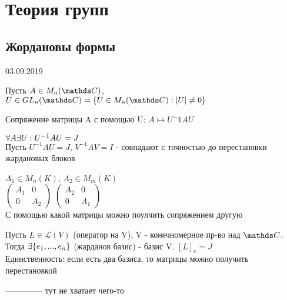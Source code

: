 \documentclass[12pt, fleqn]{article}
\begin{document}
  
    \section{Теория групп}
    \subsection{Жордановы формы}
    \begin{lect}{03.09.2019}
        \begin{utv}
            Пусть $A \in M_n(\CC)$, $U \in GL_n(\CC)=\{U \in M_n(\CC): |U| \neq 0\}$

            Сопряжение матрицы A с помощью U: $A \longmapsto U^-1 A U$
        \end{utv}

        \begin{theorem}
            $\forall A \exists U: U^{-1} A U = J$\\
            Пусть $U^{-1} A U = J$, $V^{-1} A V = I$ - совпадают с точностью до перестановки жардановых блоков
        \end{theorem}

        \begin{example}
            $A_1 \in M_n(K)$, $A_2 \in M_m(K)$\\
            $\begin{pmatrix}
              A_1 & 0\\
              0 & A_2
            \end{pmatrix}$
            $\begin{pmatrix}
              A_2 & 0\\
              0 & A_1
            \end{pmatrix}$\\
            С помощью какой матрицы можно поулчить сопряжением другую
        \end{example}

        \begin{theorem}
            Пусть $L \in \mathscr{L}(V)$ (оператор на V), V - конечномерное пр-во над $\CC$. Тогда $\exists \{e_1,...,e_n\}$ (жарданов базис) - базис V. $[L]_e=J$\\
            Единственность: если есть два базиса, то матрицы можно получить перестановкой
        \end{theorem}
        -------------- тут не хватает чего-то
    \end{lect}
\end{document}
